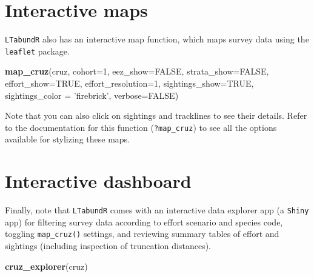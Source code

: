 \documentclass[
]{book}
\newenvironment{Shaded}{\begin{snugshade}}{\end{snugshade}}
\newcommand{\DataTypeTok}[1]{\textcolor[rgb]{0.13,0.29,0.53}{#1}}
\newcommand{\DecValTok}[1]{\textcolor[rgb]{0.00,0.00,0.81}{#1}}
\newcommand{\KeywordTok}[1]{\textcolor[rgb]{0.13,0.29,0.53}{\textbf{#1}}}
\newcommand{\NormalTok}[1]{#1}
\newcommand{\OtherTok}[1]{\textcolor[rgb]{0.56,0.35,0.01}{#1}}
\newcommand{\StringTok}[1]{\textcolor[rgb]{0.31,0.60,0.02}{#1}}
\begin{document}
\hypertarget{interactive-maps}{%
\section*{Interactive maps}\label{interactive-maps}}

\texttt{LTabundR} also has an interactive map function, which maps survey data using the \texttt{leaflet} package.

\begin{Shaded}
\begin{Highlighting}[]
 \KeywordTok{map_cruz}\NormalTok{(cruz,}
          \DataTypeTok{cohort=}\DecValTok{1}\NormalTok{,}
          \DataTypeTok{eez_show=}\OtherTok{FALSE}\NormalTok{,}
          \DataTypeTok{strata_show=}\OtherTok{FALSE}\NormalTok{,}
          \DataTypeTok{effort_show=}\OtherTok{TRUE}\NormalTok{,}
          \DataTypeTok{effort_resolution=}\DecValTok{1}\NormalTok{,}
          \DataTypeTok{sightings_show=}\OtherTok{TRUE}\NormalTok{,}
          \DataTypeTok{sightings_color =} \StringTok{'firebrick'}\NormalTok{,}
          \DataTypeTok{verbose=}\OtherTok{FALSE}\NormalTok{)}
\end{Highlighting}
\end{Shaded}

Note that you can also click on sightings and tracklines to see their details. Refer to the documentation for this function (\texttt{?map\_cruz}) to see all the options available for stylizing these maps.

\hypertarget{interactive-dashboard}{%
\section*{Interactive dashboard}\label{interactive-dashboard}}

Finally, note that \texttt{LTabundR} comes with an interactive data explorer app (a \texttt{Shiny} app) for filtering survey data according to effort scenario and species code, toggling \texttt{map\_cruz()} settings, and reviewing summary tables of effort and sightings (including inspection of truncation distances).

\begin{Shaded}
\begin{Highlighting}[]
\KeywordTok{cruz_explorer}\NormalTok{(cruz)}
\end{Highlighting}
\end{Shaded}
\end{document}
